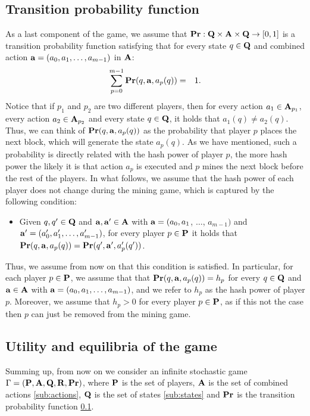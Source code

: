 \subsection{Transition probability function}\label{sub:transi}

As a last component of the game, we assume that $\mathbf{Pr} : \mathbf{Q} \times \mathbf{A} \times \mathbf{Q} \to [0,1]$ is a transition probability function satisfying that for every state $q \in \mathbf{Q}$ and combined action $\mathbf{a} = (a_0, a_1, \ldots, a_{m-1})$ in $\mathbf{A}$:
\begin{eqnarray*}\label{eq-prop}
\sum_{p=0}^{m-1} \mathbf{Pr}(q, \mathbf{a}, a_p(q)) & = & 1.
\end{eqnarray*}
Notice that if $p_1$ and $p_2$ are two different players, then for every action $a_1 \in \mathbf{A}_{p_1}$, every action $a_2 \in \mathbf{A}_{p_2}$ and every state $q \in \mathbf{Q}$, it holds that $a_1(q) \neq a_2(q)$. Thus, we can think of $\mathbf{Pr}(q, \mathbf{a}, a_p(q))$ as the probability that player $p$ places the next block, which will generate the state $a_p(q)$. As we have mentioned, such a probability is directly related with the hash power of player $p$, the more hash power the likely it is that action $a_p$ is executed and $p$ mines the next block before the rest of the players. In what follows, we assume that the hash power of each player does not change during the mining game, which is captured by the following condition:
\begin{itemize}
\item Given $q, q' \in \mathbf{Q}$ and $\mathbf{a}, \mathbf{a}' \in \mathbf{A}$ with $\mathbf{a} = (a_0, a_1$, $\ldots$, $a_{m-1})$ and $\mathbf{a}' = (a'_0, a'_1, \ldots, a'_{m-1})$, for every player $p \in \mathbf{P}$ it holds that $\mathbf{Pr}(q, \mathbf{a}, a_p(q)) = \mathbf{Pr}(q', \mathbf{a}', a'_p(q'))$.
\end{itemize}
Thus, we assume from now on that this condition is satisfied. In particular, for each player $p \in \mathbf{P}$, we assume that that
$\mathbf{Pr}(q, \mathbf{a}, a_p(q)) = h_p$ for every $q \in \mathbf{Q}$ and $\mathbf{a} \in \mathbf{A}$ with $\mathbf{a} = (a_0, a_1, \ldots, a_{m-1})$, and we refer to $h_p$ as the hash power of player $p$.
Moreover, we assume that $h_p > 0$ for every player $p \in \mathbf{P}$, as if this not the case then $p$ can just be removed from the mining game.


\subsection{Utility and equilibria of the game}
Summing up, from now on we consider an infinite stochastic game $\Gamma = (\mathbf{P},\mathbf{A},\mathbf{Q},\mathbf{R},\mathbf{Pr})$, where $\mathbf{P}$ is the set of players, $\mathbf{A}$ is the set of combined actions \ref{sub:actions}, $\mathbf{Q}$ is the set of states \ref{sub:states} and $\mathbf{Pr}$ is the transition probability function \ref{sub:transi}.


